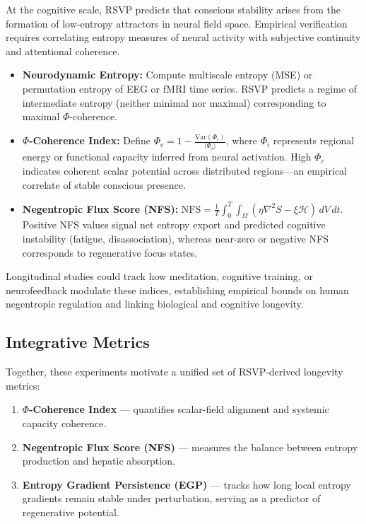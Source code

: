 \documentclass[12pt]{article}
\begin{document}
At the cognitive scale, RSVP predicts that conscious stability arises
from the formation of low-entropy attractors in neural field space.
Empirical verification requires correlating entropy measures of neural
activity with subjective continuity and attentional coherence.

\begin{itemize}
  \item \textbf{Neurodynamic Entropy:}
        Compute multiscale entropy (MSE) or permutation entropy of EEG or
        fMRI time series.  RSVP predicts a regime of intermediate entropy
        (neither minimal nor maximal) corresponding to maximal
        \(\Phi\)-coherence.
  \item \textbf{\(\Phi\)-Coherence Index:}
        Define \(\Phi_c = 1 - \frac{\mathrm{Var}(\Phi_i)}{\langle
        \Phi_i\rangle}\), where \(\Phi_i\) represents regional energy or
        functional capacity inferred from neural activation.
        High \(\Phi_c\) indicates coherent scalar potential across
        distributed regions—an empirical correlate of stable conscious
        presence.
  \item \textbf{Negentropic Flux Score (NFS):}
        \( \mathrm{NFS} =
        \frac{1}{T}\int_0^T\!\!\int_\Omega
        (\eta\nabla^2 S - \xi\mathcal{H})\,dV\,dt.\)
        Positive NFS values signal net entropy export and predicted
        cognitive instability (fatigue, disassociation), whereas
        near-zero or negative NFS corresponds to regenerative focus
        states.
\end{itemize}

Longitudinal studies could track how meditation, cognitive training, or
neurofeedback modulate these indices, establishing empirical bounds on
human negentropic regulation and linking biological and cognitive
longevity.

\subsection{Integrative Metrics}

Together, these experiments motivate a unified set of RSVP-derived
longevity metrics:

\begin{enumerate}
  \item \textbf{\(\Phi\)-Coherence Index} --- quantifies scalar-field
        alignment and systemic capacity coherence.
  \item \textbf{Negentropic Flux Score (NFS)} --- measures the balance
        between entropy production and hepatic absorption.
  \item \textbf{Entropy Gradient Persistence (EGP)} --- tracks how long
        local entropy gradients remain stable under perturbation,
        serving as a predictor of regenerative potential.
\end{enumerate}
\end{document}

